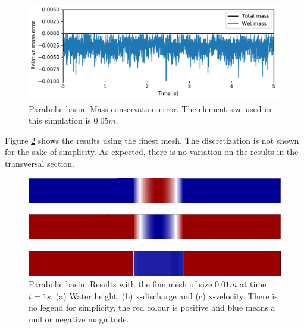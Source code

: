 \begin{figure}[H]
    \centering
    \includegraphics[width=.95\textwidth]{img/eulerian/par/mass_conservation}
    \caption{Parabolic basin. Mass conservation error. The element size used in this simulation is $0.05m$.}
    \label{parabola_mass}
\end{figure}

Figure \ref{parabola_results} shows the results using the finest mesh. The discretization is not shown for the sake of simplicity. As expected, there is no variation on the results in the transversal section.

\begin{figure}[H]
    \begin{subfigure}{.05\textwidth}
        \caption{}
    \end{subfigure}
    \begin{minipage}[c]{.94\textwidth}
        \includegraphics[width=\textwidth]{img/eulerian/par/height_1.0.png}
    \end{minipage}
\par\medskip
    \begin{subfigure}{.05\textwidth}
        \caption{}
    \end{subfigure}
    \begin{minipage}[c]{.94\textwidth}
        \includegraphics[width=\textwidth]{img/eulerian/par/momentum_1.0.png}
    \end{minipage}
\par\medskip
    \begin{subfigure}{.05\textwidth}
        \caption{}
    \end{subfigure}
    \begin{minipage}[c]{.94\textwidth}
        \includegraphics[width=\textwidth]{img/eulerian/par/velocity_1.0.png}
    \end{minipage}
\caption{Parabolic basin. Results with the fine mesh of size $0.01m$ at time $t=1s$. (a) Water height, (b) x-discharge and (c) x-velocity. There is no legend for simplicity, the red colour is positive and blue means a null or negative magnitude.}
\label{parabola_results}
\end{figure}



